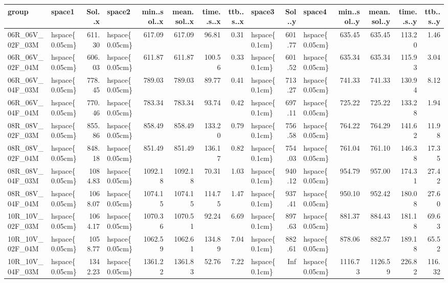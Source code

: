 
\begin{tabular}{llrlrrrrlrlrrrr}
\toprule
group & space1 & Sol..x & space2 & min..sol..x & mean.sol..x & time..s..x & ttb..s..x & space3 & Sol..y & space4 & min..sol..y & mean.sol..y & time..s..y & ttb..s..y\\
\midrule
06R\_06V\_02F\_03M & hspace\{0.05cm\} & 611.30 & hspace\{0.05cm\} & 617.09 & 617.09 & 96.81 & 0.31 & hspace\{0.1cm\} & 601.77 & hspace\{0.05cm\} & 635.45 & 635.45 & 113.20 & 1.46\\
06R\_06V\_02F\_04M & hspace\{0.05cm\} & 606.03 & hspace\{0.05cm\} & 611.87 & 611.87 & 100.56 & 0.33 & hspace\{0.1cm\} & 601.52 & hspace\{0.05cm\} & 635.34 & 635.34 & 115.93 & 3.04\\
06R\_06V\_04F\_03M & hspace\{0.05cm\} & 778.45 & hspace\{0.05cm\} & 789.03 & 789.03 & 89.77 & 0.41 & hspace\{0.1cm\} & 713.27 & hspace\{0.05cm\} & 741.33 & 741.33 & 130.94 & 8.12\\
06R\_06V\_04F\_04M & hspace\{0.05cm\} & 770.46 & hspace\{0.05cm\} & 783.34 & 783.34 & 93.74 & 0.42 & hspace\{0.1cm\} & 697.11 & hspace\{0.05cm\} & 725.22 & 725.22 & 133.28 & 1.94\\
\addlinespace
08R\_08V\_02F\_03M & hspace\{0.05cm\} & 855.86 & hspace\{0.05cm\} & 858.49 & 858.49 & 133.20 & 0.79 & hspace\{0.1cm\} & 756.58 & hspace\{0.05cm\} & 764.22 & 764.29 & 141.62 & 11.98\\
08R\_08V\_02F\_04M & hspace\{0.05cm\} & 848.18 & hspace\{0.05cm\} & 851.49 & 851.49 & 136.17 & 0.82 & hspace\{0.1cm\} & 754.03 & hspace\{0.05cm\} & 761.04 & 761.10 & 146.38 & 17.35\\
08R\_08V\_04F\_03M & hspace\{0.05cm\} & 1084.83 & hspace\{0.05cm\} & 1092.18 & 1092.18 & 70.31 & 1.03 & hspace\{0.1cm\} & 940.12 & hspace\{0.05cm\} & 954.79 & 957.00 & 174.31 & 27.42\\
08R\_08V\_04F\_04M & hspace\{0.05cm\} & 1068.07 & hspace\{0.05cm\} & 1074.15 & 1074.15 & 114.75 & 1.47 & hspace\{0.1cm\} & 937.41 & hspace\{0.05cm\} & 950.10 & 952.42 & 180.08 & 27.60\\
\addlinespace
10R\_10V\_02F\_03M & hspace\{0.05cm\} & 1064.17 & hspace\{0.05cm\} & 1070.36 & 1070.51 & 92.24 & 6.69 & hspace\{0.1cm\} & 897.63 & hspace\{0.05cm\} & 881.37 & 884.43 & 181.18 & 69.63\\
10R\_10V\_02F\_04M & hspace\{0.05cm\} & 1058.77 & hspace\{0.05cm\} & 1062.59 & 1062.61 & 134.89 & 7.04 & hspace\{0.1cm\} & 882.61 & hspace\{0.05cm\} & 878.06 & 882.57 & 189.18 & 65.52\\
10R\_10V\_04F\_03M & hspace\{0.05cm\} & 1342.23 & hspace\{0.05cm\} & 1361.22 & 1361.83 & 52.76 & 7.22 & hspace\{0.1cm\} & Inf & hspace\{0.05cm\} & 1116.73 & 1126.59 & 226.82 & 116.32\\

\end{tabular}
